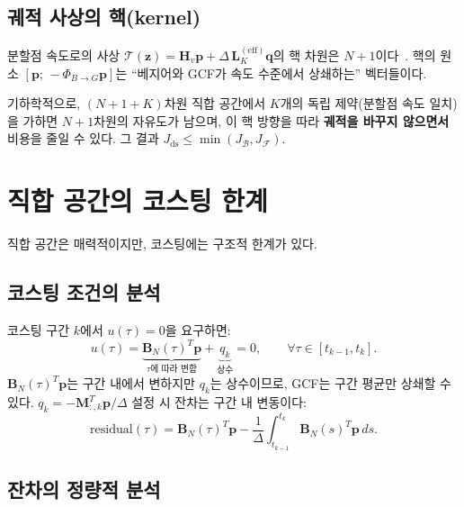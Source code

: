 \documentclass[11pt]{article}
\begin{document}
\subsection{궤적 사상의 핵(kernel)}

분할점 속도로의 사상 $\mathcal{T}(\mathbf{z}) = \mathbf{H}_v \mathbf{p} + \Delta\, \mathbf{L}_K^{(\mathrm{eff})} \mathbf{q}$의
핵 차원은 $N+1$이다~\cite{efc003}.
핵의 원소 $[\mathbf{p};\, -\Phi_{B \to G} \mathbf{p}]$는
``베지어와 GCF가 속도 수준에서 상쇄하는'' 벡터들이다.

기하학적으로, $(N{+}1{+}K)$차원 직합 공간에서
$K$개의 독립 제약(분할점 속도 일치)을 가하면
$N{+}1$차원의 자유도가 남으며,
이 핵 방향을 따라 \textbf{궤적을 바꾸지 않으면서} 비용을 줄일 수 있다.
그 결과 $J_{\mathrm{ds}} \le \min(J_{\mathcal{B}}, J_{\mathcal{F}})$.


\section{직합 공간의 코스팅 한계}
\label{sec:ds_limit}

직합 공간은 매력적이지만, 코스팅에는 구조적 한계가 있다.

\subsection{코스팅 조건의 분석}

코스팅 구간 $k$에서 $u(\tau) = 0$을 요구하면:
\begin{equation}\label{eq:coast_pointwise}
  u(\tau) = \underbrace{\mathbf{B}_N(\tau)^T \mathbf{p}}_{\tau\text{에 따라 변함}}
  + \underbrace{q_k}_{\text{상수}} = 0,
  \qquad \forall \tau \in [t_{k-1}, t_k].
\end{equation}
$\mathbf{B}_N(\tau)^T \mathbf{p}$는 구간 내에서 변하지만
$q_k$는 상수이므로, GCF는 구간 평균만 상쇄할 수 있다.
$q_k = -\mathbf{M}_{:,k}^T \mathbf{p} / \Delta$ 설정 시
잔차는 구간 내 변동이다:
\begin{equation}\label{eq:residual}
  \mathrm{residual}(\tau)
  = \mathbf{B}_N(\tau)^T \mathbf{p}
  - \frac{1}{\Delta}\int_{t_{k-1}}^{t_k} \mathbf{B}_N(s)^T \mathbf{p}\, ds.
\end{equation}

\subsection{잔차의 정량적 분석}
\end{document}
